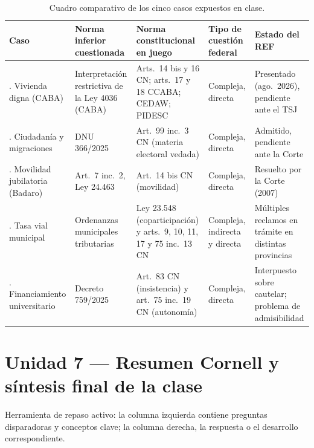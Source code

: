 \documentclass[12pt,oneside]{book}
\begin{document}
\begin{table}[H]
\centering
\footnotesize
\begin{tabularx}{\textwidth}{
    >{\raggedright\arraybackslash}p{}
    >{\raggedright\arraybackslash}p{}
    >{\raggedright\arraybackslash}p{}
    >{\raggedright\arraybackslash}p{}
    >{\raggedright\arraybackslash}X
}
\toprule
\textbf{Caso} & \textbf{Norma inferior cuestionada} & \textbf{Norma constitucional en juego} & \textbf{Tipo de cuestión federal} & \textbf{Estado del REF} \\
\midrule
1. Vivienda digna (CABA) & Interpretación restrictiva de la Ley 4036 (CABA) & Arts.\ 14 bis y 16 CN; arts.\ 17 y 18 CCABA; CEDAW; PIDESC & Compleja, directa & Presentado (ago.\ 2026), pendiente ante el TSJ \\
2. Ciudadanía y migraciones & DNU 366/2025 & Art.\ 99 inc.\ 3 CN (materia electoral vedada) & Compleja, directa & Admitido, pendiente ante la Corte \\
3. Movilidad jubilatoria (Badaro) & Art.\ 7 inc.\ 2, Ley 24.463 & Art.\ 14 bis CN (movilidad) & Compleja, directa & Resuelto por la Corte (2007) \\
4. Tasa vial municipal & Ordenanzas municipales tributarias & Ley 23.548 (coparticipación) y arts.\ 9, 10, 11, 17 y 75 inc.\ 13 CN & Compleja, indirecta y directa & Múltiples reclamos en trámite en distintas provincias \\
5. Financiamiento universitario & Decreto 759/2025 & Art.\ 83 CN (insistencia) y art.\ 75 inc.\ 19 CN (autonomía) & Compleja, directa & Interpuesto sobre cautelar; problema de admisibilidad \\
\bottomrule
\end{tabularx}
\caption{Cuadro comparativo de los cinco casos expuestos en clase.}
\end{table}

\chapter[Unidad 7 --- Resumen Cornell]{Unidad 7 --- Resumen Cornell y síntesis final de la clase}

Herramienta de repaso activo: la columna izquierda contiene preguntas disparadoras y conceptos clave; la columna derecha, la respuesta o el desarrollo correspondiente.
\end{document}
